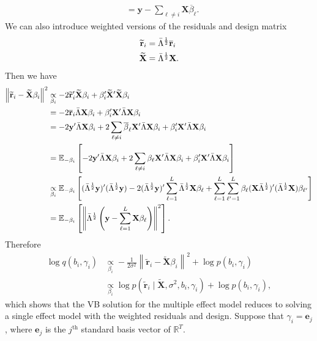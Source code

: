 \documentclass{article}
\newcommand{\E}{\mathbb{E}}
\begin{document}
\begin{itemize}
\begin{align*}
    &= \mathbf{y} - \sum_{\ell \neq i} \mathbf{X} \overline{\beta}_\ell.
\end{align*}
We can also introduce weighted versions of the residuals and design matrix
\begin{align*}
    \widetilde{\mathbf{r}}_i &= \Bar{\Lambda}^{\frac{1}{2}}\overline{\mathbf{r}}_i \\
    \widetilde{\mathbf{X}} &= \Bar{\Lambda}^{\frac{1}{2}} \mathbf{X}.
\end{align*}
Then we have 
\begin{align*}
    \left\lVert \widetilde{\mathbf{r}}_i - \widetilde{\mathbf{X}}\beta_i \right\rVert^2 &\underset{\beta_i}{\propto} -2\widetilde{\mathbf{r}}'_i\widetilde{\mathbf{X}}\beta_i + \beta'_i\widetilde{\mathbf{X}}'\widetilde{\mathbf{X}}\beta_i \\ 
    &= -2 \overline{\mathbf{r}}_i \Bar{\Lambda} \mathbf{X}\beta_i + \beta'_i \mathbf{X}'\Bar{\Lambda} \mathbf{X}\beta_i \\
    &= -2 \mathbf{y}' \Bar{\Lambda} \mathbf{X}\beta_i + 2 \sum_{\ell \neq i} \overline{\beta}_\ell \mathbf{X}'\Bar{\Lambda}\mathbf{X}\beta_i + \beta'_i \mathbf{X}'\Bar{\Lambda} \mathbf{X}\beta_i \\
    &= \E_{-\beta_i}\left[-2 \mathbf{y}' \Bar{\Lambda} \mathbf{X}\beta_i + 2 \sum_{\ell \neq i} \beta_\ell \mathbf{X}'\Bar{\Lambda}\mathbf{X}\beta_i + \beta'_i \mathbf{X}'\Bar{\Lambda} \mathbf{X}\beta_i\right] \\
    &\underset{\beta_i}{\propto} \E_{-\beta_i}\left[(\Bar{\Lambda}^{\frac{1}{2}}\mathbf{y})' (\Bar{\Lambda}^{\frac{1}{2}}\mathbf{y})  -2 (\Bar{\Lambda}^{\frac{1}{2}}\mathbf{y})'  \sum_{\ell = 1}^L \Bar{\Lambda}^{\frac{1}{2}}\mathbf{X}\beta_\ell  + \sum_{\ell =1}^L\sum_{\ell'=1}^L \beta_\ell (\mathbf{X}\Bar{\Lambda}^{\frac{1}{2}})'(\Bar{\Lambda}^{\frac{1}{2}}\mathbf{X})\beta_{\ell'} \right] \\
    &=  \E_{-\beta_i} \left[\left\lVert \Bar{\Lambda}^{\frac{1}{2}} \left(\mathbf{y} - \sum_{\ell=1}^L \mathbf{X} \beta_\ell\right) \right\rVert^2\right].
\end{align*}
Therefore 
\begin{align*}
    \log q(b_i,\gamma_i) &\underset{\beta_i}{\propto} -\frac{1}{2\sigma^2}\left\lVert \widetilde{\mathbf{r}}_i - \widetilde{\mathbf{X}}\beta_i \right\rVert^2 + \log p(b_i,\gamma_i) \\
    &\underset{\beta_i}{\propto} \log p\left(\widetilde{\mathbf{r}}_i \;|\; \widetilde{\mathbf{X}}, \sigma^2, b_i,\gamma_i\right) + \log p(b_i,\gamma_i),
\end{align*}
which shows that the VB solution for the multiple effect model reduces to solving a single effect model with the weighted residuals and design. Suppose that $\gamma_i = \mathbf{e}_j$, where $\mathbf{e}_j$ is the $j^{\text{th}}$ standard basis vector of $\mathbb{R}^T$. 


\end{itemize}
\end{document}

